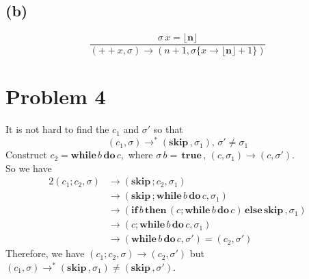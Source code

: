 \documentclass[a4papers]{ctexart}
\begin{document}
\subsection{(b)}
\[ \dfrac{\sigma\, x = \lfloor \mathbf{n} \rfloor  }{(++x,\sigma)\rightarrow (n+1,\sigma\{ x \rightarrow \lfloor \mathbf{n} \rfloor +1\})}\]


\section{Problem 4}
\noindent It is not hard to find the $c_1$ and $\sigma'$ so that
\[(c_1,\sigma)\rightarrow^* (\mathbf{skip}\, ,\sigma_1),\, \sigma' \ne \sigma_1 \]
Construct $c_2 = \mathbf{while}\,  b \, \mathbf{do}\, c$,\, where $\sigma\, b =  \, \mathbf{true}\, ,\, (c,\sigma_1)\rightarrow (c,\sigma')$.\\
So we have
\begin{alignat*}{2}
    (c_1;c_2,\sigma) 
    &\rightarrow (\mathbf{skip}\, ;c_2,\sigma_1)\\
    &\rightarrow (\mathbf{skip}\, ;\mathbf{while}\,  b \, \mathbf{do}\, c,\sigma_1)\\
    &\rightarrow ( \mathbf{if}\,  b  \, \mathbf{then}\,  (c;\mathbf{while}\,  b \, \mathbf{do}\, c)\, \mathbf{else}\,  \mathbf{skip}\, ,\sigma_1)\\
    &\rightarrow (c;\mathbf{while}\,  b \, \mathbf{do}\, c,\sigma_1) \\
    &\rightarrow (\mathbf{while}\,  b \, \mathbf{do}\, c,\sigma') = (c_2,\sigma')
\end{alignat*}
Therefore, we have $(c_1;c_2,\sigma) \rightarrow (c_2,\sigma')$ but $(c_1,\sigma)\rightarrow^* (\mathbf{skip}\, ,\sigma_1)\ne (\textbf{skip}\, ,\sigma')$.
\end{document}
